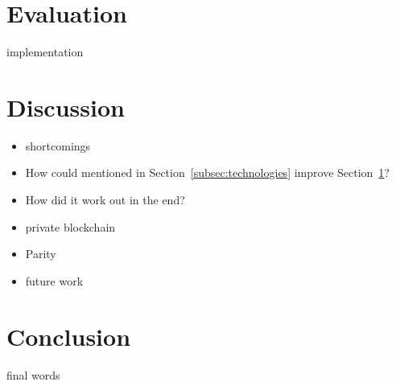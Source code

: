 \documentclass[runningheads]{llncs}
\newcommand{\refsec}[1]{Section~\ref{#1}}
\begin{document}
\section{Evaluation} \label{sec:eval}

implementation


\section{Discussion} \label{sec:discussion}

\begin{itemize}
    \item shortcomings
    \item How could mentioned in \refsec{subsec:technologies} improve \refsec{sec:eval}?
    \item How did it work out in the end? 
    \item private blockchain
    \item Parity
    \item future work
\end{itemize}


\section{Conclusion} \label{sec:conclusion}

final words




\end{document}
